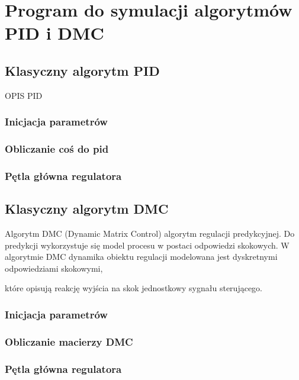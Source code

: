 \section{Program do symulacji algorytmów PID i DMC}
\label{projekt:zad3}

\subsection{Klasyczny algorytm PID}
\label{projekt:zad3:PID:program}

OPIS PID


\subsubsection{Inicjacja parametrów}
%
\newpage

\subsubsection{Obliczanie coś do pid}
%
\newpage


\subsubsection{Pętla główna regulatora}
%

\newpage

\subsection{Klasyczny algorytm DMC}
\label{projekt:zad3:DMC:program}

Algorytm DMC (Dynamic Matrix Control) algorytm regulacji predykcyjnej. 
Do predykcji wykorzystuje się model procesu w postaci odpowiedzi skokowych. 
W algorytmie DMC dynamika obiektu regulacji modelowana jest dyskretnymi odpowiedziami skokowymi, 

które opisują reakcję wyjścia na skok jednostkowy sygnału sterującego.

\subsubsection{Inicjacja parametrów}
%
\newpage

\subsubsection{Obliczanie macierzy DMC}
%
\newpage


\subsubsection{Pętla główna regulatora}
%
\newpage
